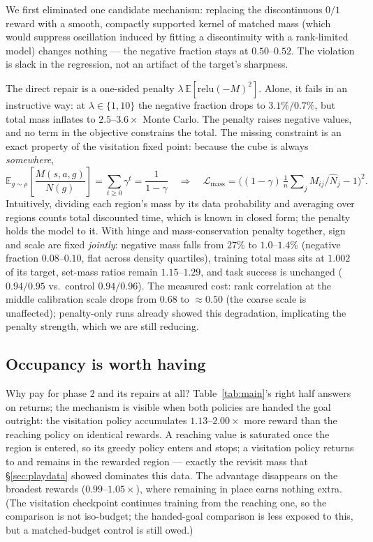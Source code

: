 \documentclass{article}
\newcommand{\E}{\mathbb{E}}
\newcommand{\Nhat}{\hat N}
\begin{document}
We first eliminated one candidate mechanism: replacing the discontinuous $0/1$
reward with a smooth, compactly supported kernel of matched mass (which would
suppress oscillation induced by fitting a discontinuity with a rank-limited
model) changes nothing --- the negative fraction stays at $0.50$--$0.52$. The
violation is slack in the regression, not an artifact of the target's
sharpness.

The direct repair is a one-sided penalty $\lambda\,\E[\mathrm{relu}(-M)^2]$.
Alone, it fails in an instructive way: at $\lambda\in\{1,10\}$ the negative
fraction drops to $3.1\%/0.7\%$, but total mass inflates to $2.5$--$3.6\times$
Monte Carlo. The penalty raises negative values, and no term in the objective
constrains the total. The missing constraint is an exact property of the
visitation fixed point: because the cube is always \emph{somewhere},
\begin{equation}
\label{eq:mass-anchor}
\E_{g\sim\rho}\!\left[\frac{M(s,a,g)}{N(g)}\right]=\sum_{t\ge0}\gamma^t
=\frac{1}{1-\gamma}
\quad\Longrightarrow\quad
\mathcal{L}_{\mathrm{mass}}
=
\Big((1-\gamma)\,\tfrac{1}{n}\sum\nolimits_j M_{ij}/\Nhat_j-1\Big)^{2}.
\end{equation}
Intuitively, dividing each region's mass by its data probability and averaging
over regions counts total discounted time, which is known in closed form; the
penalty holds the model to it. With hinge and mass-conservation penalty
together, sign and scale are fixed \emph{jointly}: negative mass falls from
$27\%$ to $1.0$--$1.4\%$ (negative fraction $0.08$--$0.10$, flat across density
quartiles), training total mass sits at $1.002$ of its target, set-mass ratios
remain $1.15$--$1.29$, and task success is unchanged ($0.94/0.95$ vs.\ control
$0.94/0.96$). The measured cost: rank correlation at the middle calibration
scale drops from $0.68$ to $\approx0.50$ (the coarse scale is unaffected);
penalty-only runs already showed this degradation, implicating the penalty
strength, which we are still reducing.

\subsection{Occupancy is worth having}
\label{sec:cross-method}

Why pay for phase 2 and its repairs at all? Table~\ref{tab:main}'s right half
answers on returns; the mechanism is visible when both policies are handed the
goal outright: the visitation policy accumulates $1.13$--$2.00\times$ more
reward than the reaching policy on identical rewards. A reaching value is
saturated once the region is entered, so its greedy policy enters and stops; a
visitation policy returns to and remains in the rewarded region --- exactly the
revisit mass that \S\ref{sec:playdata} showed dominates this data. The
advantage disappears on the broadest rewards ($0.99$--$1.05\times$), where
remaining in place earns nothing extra. (The visitation checkpoint continues
training from the reaching one, so the comparison is not iso-budget; the
handed-goal comparison is less exposed to this, but a matched-budget control is
still owed.)
\end{document}
